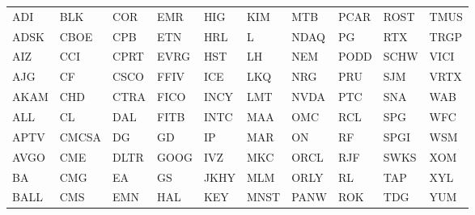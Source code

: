 \begin{tabular}{llllllllll}
\toprule
ADI & BLK & COR & EMR & HIG & KIM & MTB & PCAR & ROST & TMUS \\
ADSK & CBOE & CPB & ETN & HRL & L & NDAQ & PG & RTX & TRGP \\
AIZ & CCI & CPRT & EVRG & HST & LH & NEM & PODD & SCHW & VICI \\
AJG & CF & CSCO & FFIV & ICE & LKQ & NRG & PRU & SJM & VRTX \\
AKAM & CHD & CTRA & FICO & INCY & LMT & NVDA & PTC & SNA & WAB \\
ALL & CL & DAL & FITB & INTC & MAA & OMC & RCL & SPG & WFC \\
APTV & CMCSA & DG & GD & IP & MAR & ON & RF & SPGI & WSM \\
AVGO & CME & DLTR & GOOG & IVZ & MKC & ORCL & RJF & SWKS & XOM \\
BA & CMG & EA & GS & JKHY & MLM & ORLY & RL & TAP & XYL \\
BALL & CMS & EMN & HAL & KEY & MNST & PANW & ROK & TDG & YUM \\
\bottomrule
\end{tabular}
